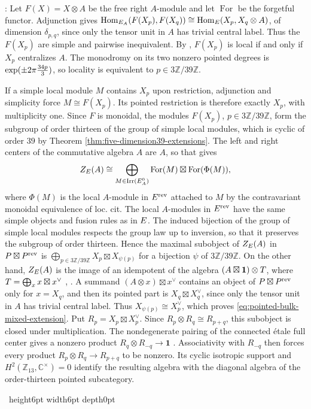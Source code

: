 \documentclass[leqno]{article}
\newcommand{\Cbb}{\ensuremath{\mathbb{C}}}
\let\cal\relax
\newcommand{\cal}{\mathcal}
\newcommand{\Z}{\ensuremath{\mathbb{Z}}}
\newcommand{\qed}{\hfill \vrule height6pt  width6pt depth0pt}
\newcommand{\ot}{\otimes}
\let\i\relax
\newcommand{\i}{\mathrm{i}}
\DeclareMathOperator{\Irr}{Irr}
\newenvironment{proof}[1][]{\noindent {\it Proof #1} : }{\hbox{~}\qed
\smallskip
}
\numberwithin{equation}{section}
\begin{document}
\begin{proof}
Let $F(X) = X\ot A$ be the free right $A$-module and let $\operatorname{For}$ be the forgetful functor. Adjunction gives $\operatorname{Hom}_{\cal E_A}(F(X_p),F(X_q)) \cong \operatorname{Hom}_{\cal E}(X_p,X_q\ot A)$, of dimension $\delta_{p,q}$, since only the tensor unit in $A$ has trivial central label. Thus the $F(X_p)$ are simple and pairwise inequivalent. By \cite[Lemma 3.15 p.~11]{DMNO13}, $F(X_p)$ is local if and only if $X_p$ centralizes $A$. The monodromy on its two nonzero pointed degrees is $\exp(\pm2\pi\i\frac{34p}{3})$, so locality is equivalent to $p \in 3\Z/39\Z$.

If a simple local module $M$ contains $X_p$ upon restriction, adjunction and simplicity force $M \cong F(X_p)$. Its pointed restriction is therefore exactly $X_p$, with multiplicity one. Since $F$ is monoidal, the modules $F(X_p)$, $p \in 3\Z/39\Z$, form the subgroup of order thirteen of the group of simple local modules, which is cyclic of order $39$ by Theorem \ref{thm:five-dimension39-extensions}. The left and right centers of the commutative algebra $A$ are $A$, so that \cite[Theorem 2.5.1 p.~1328]{Dav10} gives
\[
Z_{\cal E}(A) \cong \bigoplus_{M \in \Irr(\cal E_A^0)}
\operatorname{For}(M)\boxtimes\operatorname{For}(\Phi(M)),
\]
where $\Phi(M)$ is the local $A$-module in $\cal E^{\mathrm{rev}}$ attached to $M$ by the contravariant monoidal equivalence of loc. cit. The local $A$-modules in $\cal E^{\mathrm{rev}}$ have the same simple objects and fusion rules as in $\cal E$. The induced bijection of the group of simple local modules respects the group law up to inversion, so that it preserves the subgroup of order thirteen. Hence the maximal subobject of $Z_{\cal E}(A)$ in $\cal P\boxtimes\cal P^{\mathrm{rev}}$ is $\bigoplus_{p \in 3\Z/39\Z}X_p\boxtimes X_{\psi(p)}$ for a bijection $\psi$ of $3\Z/39\Z$. On the other hand, $Z_{\cal E}(A)$ is the image of an idempotent of the algebra $(A\boxtimes\mathbf1)\ot\cal T$, where $\cal T = \bigoplus_x x\boxtimes x^\vee$ \cite[Definitions 2.4 and 2.6]{KoR08}, \cite[Section 2.4 p.~1327]{Dav10}. A summand $(A\ot x)\boxtimes x^\vee$ contains an object of $\cal P\boxtimes\cal P^{\mathrm{rev}}$ only for $x = X_q$, and then its pointed part is $X_q\boxtimes X_q^\vee$, since only the tensor unit in $A$ has trivial central label. Thus $X_{\psi(p)} \cong X_p^\vee$, which proves \eqref{eq:pointed-bulk-mixed-extension}. Put $R_p = X_p\boxtimes X_p^\vee$. Since $R_p\ot R_q \cong R_{p+q}$, this subobject is closed under multiplication. The nondegenerate pairing of the connected \'etale full center gives a nonzero product $R_q\ot R_{-q} \to \mathbf1$ \cite[Remark 3.4 p.~7]{DMNO13}. Associativity with $R_{-q}$ then forces every product $R_p\ot R_q \to R_{p+q}$ to be nonzero. Its cyclic isotropic support and $H^2(\Z_{13},\Cbb^\times) = 0$ identify the resulting algebra with the diagonal algebra of the order-thirteen pointed subcategory.


\end{proof}
\end{document}
